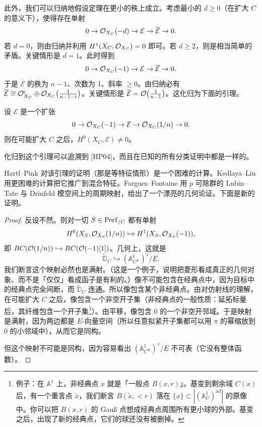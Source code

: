 此外，我们可以归纳地假设定理在更小的秩上成立。考虑最小的 $d\ge0$（在扩大 $C$ 的意义下），使得存在单射
\[
0\to\mathcal{O}_{X_C}(-d)\to\mathcal{E}\to\overline{\mathcal{E}}\to0.
\]
若 $d=0$，则由归纳并利用 $H^1(X_C,\mathcal{O}_{X_C})=0$ 即可。若 $d\ge2$，则是相当简单的矛盾。关键情形是 $d=1$。此时得到
\[
0\to\mathcal{O}_{X_C}(-1)\to\mathcal{E}\to\overline{\mathcal{E}}\to0.
\]
于是 $\overline{\mathcal{E}}$ 的秩为 $n-1$、次数为 1、斜率 $\ge0$。由归纳必有 $\overline{\mathcal{E}}\cong\mathcal{O}^i_{X_C}\oplus\mathcal{O}_{X_C}\bigl(\frac{1}{n-1-i}\bigr)$。关键情形是 $\overline{\mathcal{E}}=\mathcal{O}\bigl(\frac{1}{n-1}\bigr)$。这化归为下面的引理。


\begin{lemma}
设 $\mathcal{E}$ 是一个扩张
\[
0\to\mathcal{O}_{X_C}(-1)\to\mathcal{E}\to\mathcal{O}_{X_C}(1/n)\to0.
\]
则在可能扩大 $C$ 之后，$H^0(X_C,\mathcal{E})\neq0$。
\end{lemma}

\begin{remark}
化归到这个引理可以追溯到 [HP04]，而且在已知的所有分类证明中都是一样的。

Hartl--Pink 对该引理的证明（那是等特征情形）是一个困难的计算。Kedlaya--Liu 用更困难的计算把它推广到混合特征。Fargues--Fontaine 用 $p$ 可除群的 Lubin--Tate 与 Drinfeld 模空间上的周期映射，给出了一个漂亮的几何论证。下面是新的证明。
\end{remark}

\begin{proof}
反设不然。则对一切 $S\in\mathrm{Perf}_{/C}$ 都有单射
\[
H^0(X_S,\mathcal{O}_{X_S}(1/n))\hookrightarrow H^1(X_S,\mathcal{O}_{X_S}(-1)),
\]
即 $BC(\mathcal{O}(1/n))\hookrightarrow BC(\mathcal{O}(-1)[1])$。几何上，这就是
\[
\widetilde{\mathbb{D}}_C\hookrightarrow(\mathbb{A}^1_{C^\#})^\diamond/\underline{E}.
\]
我们断言这个映射必然也是满射。（这是一个例子，说明把菱形看成真正的几何对象、而不是「仅仅」看成函子是有利的。）像不可能包含在经典点中，因为目标中的经典点完全间断，而 $\widetilde{\mathbb{D}}_C$ 连通。所以像包含某个非经典点。由对仿射线的理解，在可能扩大 $C$ 之后，像包含一个非空开子集（非经典点的一般性质：延拓标量后，其纤维包含一个开子集\footnote{例子：在 $\mathbb{A}^1$ 上，非经典点 $x$ 就是「一般点 $B(x,r)$」。基变到剩余域 $C(x)$ 后，有一个重言点 $\tilde x$，我们断言 $B(\tilde x,<r)$ 落在 $\{x\}\subset|(\mathbb{A}^1_C)^{\mathrm{ad}}|$ 的原像中。你可以把 $B(x,r)$ 的 Gauß 点想成经典点周围所有更小球的外部。基变之后，出现了新的经典点，它们的球还没有被删掉。}）。由平移，像包含 0 的一个非空开邻域。于是映射是满射，因为两边都是 $E$-向量空间（所以任意拟紧开子集都可以用 $\pi$ 的幂缩放到 0 的小邻域中），从而它是同构。

但这个映射不可能是同构，因为容易看出 $(\mathbb{A}^1_{C^\#})^\diamond/\underline{E}$ 不可表（它没有整体函数）。
\end{proof}
